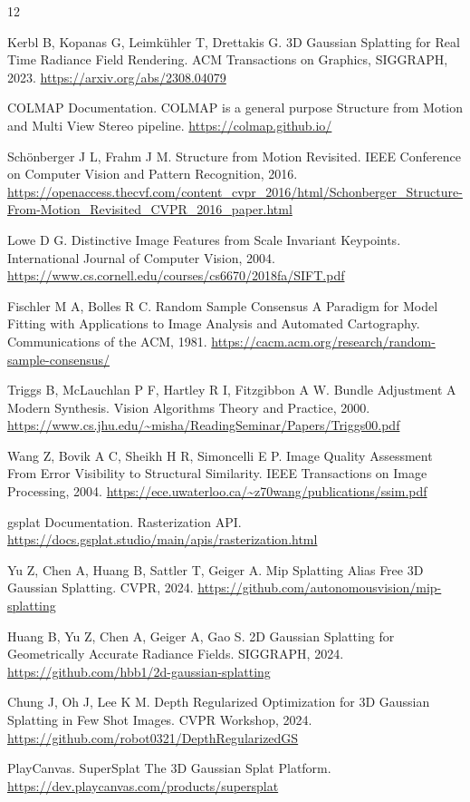 \documentclass[UTF8,a4paper,11pt]{ctexart}
\begin{document}
\begin{thebibliography}{12}

Kerbl B, Kopanas G, Leimkühler T, Drettakis G.
3D Gaussian Splatting for Real Time Radiance Field Rendering.
ACM Transactions on Graphics, SIGGRAPH, 2023.
\url{https://arxiv.org/abs/2308.04079}

COLMAP Documentation.
COLMAP is a general purpose Structure from Motion and Multi View Stereo pipeline.
\url{https://colmap.github.io/}

Schönberger J L, Frahm J M.
Structure from Motion Revisited.
IEEE Conference on Computer Vision and Pattern Recognition, 2016.
\url{https://openaccess.thecvf.com/content_cvpr_2016/html/Schonberger_Structure-From-Motion_Revisited_CVPR_2016_paper.html}

Lowe D G.
Distinctive Image Features from Scale Invariant Keypoints.
International Journal of Computer Vision, 2004.
\url{https://www.cs.cornell.edu/courses/cs6670/2018fa/SIFT.pdf}

Fischler M A, Bolles R C.
Random Sample Consensus A Paradigm for Model Fitting with Applications to Image Analysis and Automated Cartography.
Communications of the ACM, 1981.
\url{https://cacm.acm.org/research/random-sample-consensus/}

Triggs B, McLauchlan P F, Hartley R I, Fitzgibbon A W.
Bundle Adjustment A Modern Synthesis.
Vision Algorithms Theory and Practice, 2000.
\url{https://www.cs.jhu.edu/~misha/ReadingSeminar/Papers/Triggs00.pdf}

Wang Z, Bovik A C, Sheikh H R, Simoncelli E P.
Image Quality Assessment From Error Visibility to Structural Similarity.
IEEE Transactions on Image Processing, 2004.
\url{https://ece.uwaterloo.ca/~z70wang/publications/ssim.pdf}

gsplat Documentation.
Rasterization API.
\url{https://docs.gsplat.studio/main/apis/rasterization.html}

Yu Z, Chen A, Huang B, Sattler T, Geiger A.
Mip Splatting Alias Free 3D Gaussian Splatting.
CVPR, 2024.
\url{https://github.com/autonomousvision/mip-splatting}

Huang B, Yu Z, Chen A, Geiger A, Gao S.
2D Gaussian Splatting for Geometrically Accurate Radiance Fields.
SIGGRAPH, 2024.
\url{https://github.com/hbb1/2d-gaussian-splatting}

Chung J, Oh J, Lee K M.
Depth Regularized Optimization for 3D Gaussian Splatting in Few Shot Images.
CVPR Workshop, 2024.
\url{https://github.com/robot0321/DepthRegularizedGS}

PlayCanvas.
SuperSplat The 3D Gaussian Splat Platform.
\url{https://dev.playcanvas.com/products/supersplat}

\end{thebibliography}
\end{document}
